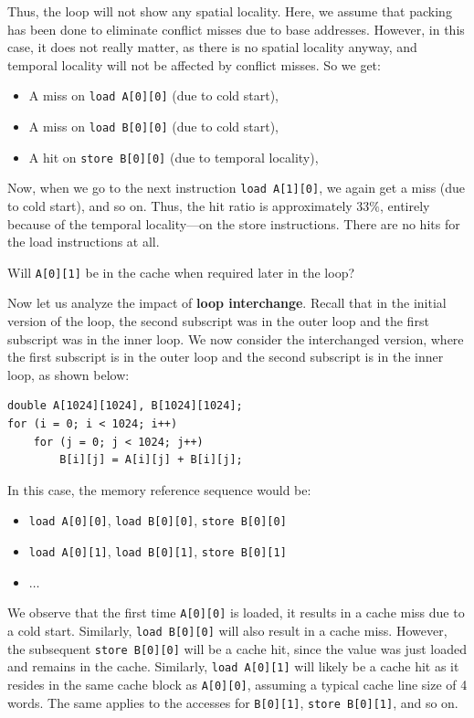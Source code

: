 \documentclass[12pt]{book}
\begin{document}
Thus, the loop will not show any spatial locality. Here, we assume that packing has been done to eliminate conflict misses due to base addresses. However, in this case, it does not really matter, as there is no spatial locality anyway, and temporal locality will not be affected by conflict misses. So we get:
\begin{itemize}
    \item A miss on \texttt{load A[0][0]} (due to cold start),
    \item A miss on \texttt{load B[0][0]} (due to cold start),
    \item A hit on \texttt{store B[0][0]} (due to temporal locality),
\end{itemize}
Now, when we go to the next instruction \texttt{load A[1][0]}, we again get a miss (due to cold start), and so on. Thus, the hit ratio is approximately $33\%$, entirely because of the temporal locality—on the store instructions. There are no hits for the load instructions at all.

Will \texttt{A[0][1]} be in the cache when required later in the loop? 

Now let us analyze the impact of \textbf{loop interchange}. Recall that in the initial version of the loop, the second subscript was in the outer loop and the first subscript was in the inner loop. We now consider the interchanged version, where the first subscript is in the outer loop and the second subscript is in the inner loop, as shown below:

\begin{lstlisting}
double A[1024][1024], B[1024][1024];
for (i = 0; i < 1024; i++)
    for (j = 0; j < 1024; j++)
        B[i][j] = A[i][j] + B[i][j];
\end{lstlisting}

In this case, the memory reference sequence would be:
\begin{itemize}
    \item \texttt{load A[0][0]}, \texttt{load B[0][0]}, \texttt{store B[0][0]}
    \item \texttt{load A[0][1]}, \texttt{load B[0][1]}, \texttt{store B[0][1]}
    \item $\dots$
\end{itemize}

We observe that the first time \texttt{A[0][0]} is loaded, it results in a cache miss due to a cold start. Similarly, \texttt{load B[0][0]} will also result in a cache miss. However, the subsequent \texttt{store B[0][0]} will be a cache hit, since the value was just loaded and remains in the cache. Similarly, \texttt{load A[0][1]} will likely be a cache hit as it resides in the same cache block as \texttt{A[0][0]}, assuming a typical cache line size of 4 words. The same applies to the accesses for \texttt{B[0][1]}, \texttt{store B[0][1]}, and so on.
\end{document}
